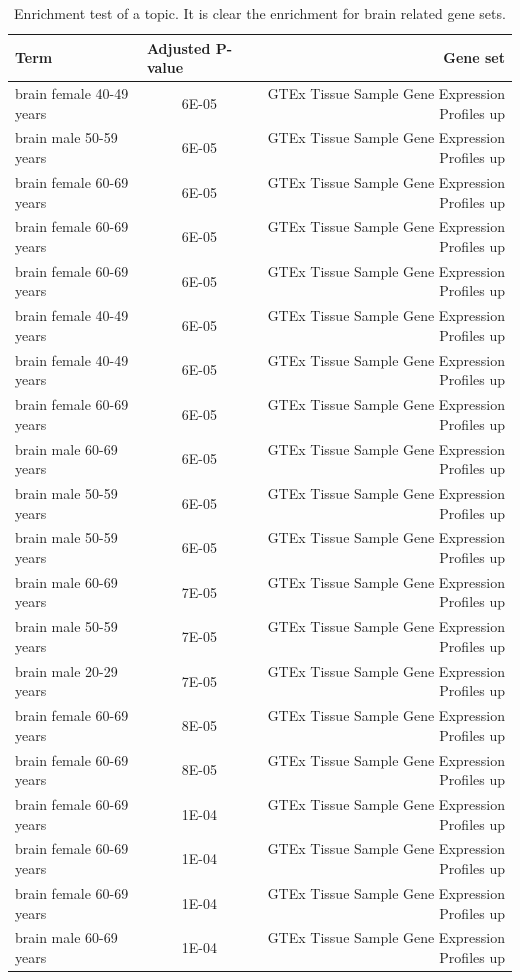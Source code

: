 \begin{table}[htb!]
	\tiny
	\begin{center}
		\begin{tabular}{|l|c|r|}
			\hline
			Term & \multicolumn{1}{l|}{Adjusted P-value} & Gene set \\ \hline
			brain female 40-49 years & 6E-05 & GTEx Tissue Sample Gene Expression Profiles up \\ \hline
			brain male 50-59 years & 6E-05 & GTEx Tissue Sample Gene Expression Profiles up \\ \hline
			brain female 60-69 years & 6E-05 & GTEx Tissue Sample Gene Expression Profiles up \\ \hline
			brain female 60-69 years & 6E-05 & GTEx Tissue Sample Gene Expression Profiles up \\ \hline
			brain female 60-69 years & 6E-05 & GTEx Tissue Sample Gene Expression Profiles up \\ \hline
			brain female 40-49 years & 6E-05 & GTEx Tissue Sample Gene Expression Profiles up \\ \hline
			brain female 40-49 years & 6E-05 & GTEx Tissue Sample Gene Expression Profiles up \\ \hline
			brain female 60-69 years & 6E-05 & GTEx Tissue Sample Gene Expression Profiles up \\ \hline
			brain male 60-69 years & 6E-05 & GTEx Tissue Sample Gene Expression Profiles up \\ \hline
			brain male 50-59 years & 6E-05 & GTEx Tissue Sample Gene Expression Profiles up \\ \hline
			brain male 50-59 years & 6E-05 & GTEx Tissue Sample Gene Expression Profiles up \\ \hline
			brain male 60-69 years & 7E-05 & GTEx Tissue Sample Gene Expression Profiles up \\ \hline
			brain male 50-59 years & 7E-05 & GTEx Tissue Sample Gene Expression Profiles up \\ \hline
			brain male 20-29 years & 7E-05 & GTEx Tissue Sample Gene Expression Profiles up \\ \hline
			brain female 60-69 years & 8E-05 & GTEx Tissue Sample Gene Expression Profiles up \\ \hline
			brain female 60-69 years & 8E-05 & GTEx Tissue Sample Gene Expression Profiles up \\ \hline
			brain female 60-69 years & 1E-04 & GTEx Tissue Sample Gene Expression Profiles up \\ \hline
			brain female 60-69 years & 1E-04 & GTEx Tissue Sample Gene Expression Profiles up \\ \hline
			brain female 60-69 years & 1E-04 & GTEx Tissue Sample Gene Expression Profiles up \\ \hline
			brain male 60-69 years & 1E-04 & GTEx Tissue Sample Gene Expression Profiles up \\ \hline
		\end{tabular}
	\end{center}
	\caption{Enrichment test of a topic. It is clear the enrichment for brain related gene sets.}
	\label{tab:topic/enrich/brain}
\end{table}
